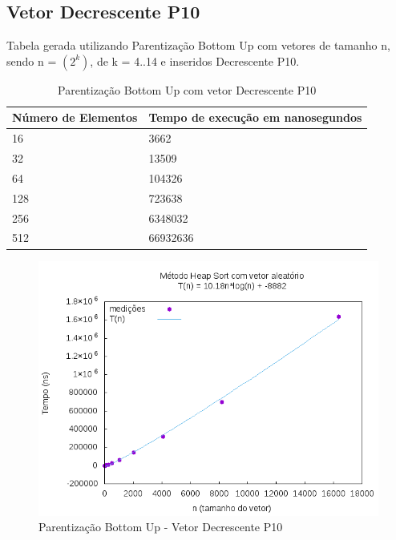 \documentclass[12pt,a4paper,twoside]{report}
\begin{document}
\subsection{Vetor Decrescente P10}
Tabela gerada utilizando Parentização Bottom Up com vetores de tamanho n, sendo n = $(2^k)$, de k = 4..14 e inseridos Decrescente P10.
\begin{table}[H]
\centering
\caption{Parentização Bottom Up com vetor Decrescente P10}
\label{my-label}
\begin{tabular}{|l|l|}
\hline
\multicolumn{1}{|c|}{\textbf{Número de Elementos}} & \multicolumn{1}{c|}{\textbf{Tempo de execução em nanosegundos}} \\ \hline
16 & 3662 \\ \hline
32 & 13509 \\ \hline
64 & 104326 \\ \hline
128 & 723638 \\ \hline
256 & 6348032 \\ \hline
512 & 66932636 \\ \hline

\end{tabular}
\end{table}

\begin{figure}[H]
    \centering
    \includegraphics[width=0.7\linewidth]{graficos/HeapSort/vIntAleatorio/vIntAleatorio.png}
  \caption{Parentização Bottom Up - Vetor Decrescente P10}
\end{figure}
\end{document}
